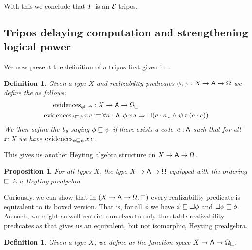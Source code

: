 \documentclass[11pt]{article}
\newtheorem{prop}[thrm]{Proposition}
\newtheorem{defn}[thrm]{Definition}
\begin{document}
With this we conclude that \(T\) is an \(\mathcal{E}\)-tripos.

\subsection{Tripos delaying computation and strengthening logical power}%
\label{sub:vo-tripos}

We now present the definition of a tripos first given
in~\cite[\S6.3]{vanoostenExercisesRealizability2018}.

\begin{defn}\label{defn:vo-tripos-ordering}
  Given a type \(X\) and realizability predicates
  \(\phi,\psi : {{X}\to{{{\ensuremath{\mathsf{A}}}\to{\Omega}}}}\) we define the  as follows:
  \begin{align*}
    \IEvidenceCl{\phi}{\psi}
    &: \IRealPredCl{X}
    \\
    {\IEvidenceCl{\phi}{\psi}\,x\,e}
    &\IsDefined
      \IForall%
      {a:\A}%
      {\IImplies%
      {\phi\,x\,a}%
      {\IBox{(\IAnd{\ITotal{\IAp{e}{a}}}{\psi\,x\,(\IAp{e}{a})})}}}
  \end{align*}
  We then define the  by saying \({\phi}\sqsubseteq{\psi}\) if there exists a
  code~\(e : \mathsf{A}\) such that for all \(x : X\) we have
  \(\text{evidences}_{{\phi}\sqsubseteq{\psi}}\,x\,e\).
\end{defn}

This gives us another Heyting algebra structure on \({{X}\to{{{\ensuremath{\mathsf{A}}}\to{\Omega}}}}\).

\begin{prop}
  For all types \(X\), the type \({{X}\to{{{\ensuremath{\mathsf{A}}}\to{\Omega}}}}\) equipped with the
  ordering \(\sqsubseteq\) is a Heyting prealgebra.
\end{prop}

Curiously, we can show that in \(({{X}\to{{{\ensuremath{\mathsf{A}}}\to{\Omega}}}},\sqsubseteq)\) every
realizability predicate is equivalent to its boxed version.
%
That is, for all \(\phi\) we have \({\phi}\sqsubseteq{\Box{\phi}}\) and
\({\Box{\phi}}\sqsubseteq{\phi}\).
%
As such, we might as well restrict ourselves to only the stable realizability
predicates as that gives us an equivalent, but not isomorphic, Heyting
prealgebra.

\begin{defn}\label{defn:vo-tripos-predicates}
  Given a type \(X\), we define  as the function space \({{X}\to{{{\ensuremath{\mathsf{A}}}\to{\Omega_\Box}}}}\).
\end{defn}
\end{document}
